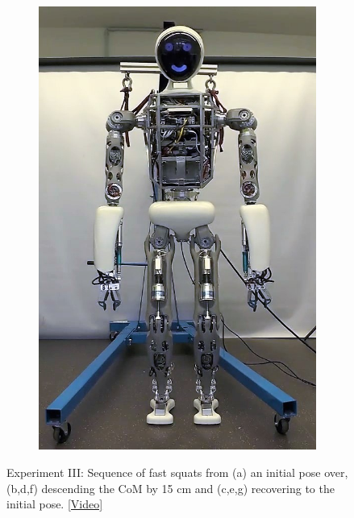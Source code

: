 \begin{figure}
\begin{subfigure}{.14\textwidth}
	\includegraphics[width=.95\linewidth]{experiments/squats/snaps/7}
	\caption{}
	\end{subfigure}%
\caption[Experiment III: Sequence of fast squats]{Experiment III: Sequence of fast squats from (a) an initial pose over, (b,d,f) descending the \gls{CoM} by 15 cm and (c,e,g) recovering to the initial pose. \href{https://github.com/julesser/ma-thesis-experimental-results/blob/master/squats/squat15cm_2s.mp4}{[Video]}}
\label{exp:squatSnaps}
\end{figure} 

